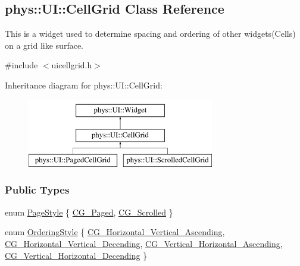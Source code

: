 \hypertarget{classphys_1_1UI_1_1CellGrid}{
\subsection{phys::UI::CellGrid Class Reference}
\label{classphys_1_1UI_1_1CellGrid}
}


This is a widget used to determine spacing and ordering of other widgets(Cells) on a grid like surface.  




{\ttfamily \#include $<$uicellgrid.h$>$}

Inheritance diagram for phys::UI::CellGrid:\begin{figure}[H]
\begin{center}
\leavevmode
\includegraphics[height=3.000000cm]{classphys_1_1UI_1_1CellGrid}
\end{center}
\end{figure}
\subsubsection*{Public Types}
\begin{DoxyCompactItemize}
\item 
enum \hyperlink{classphys_1_1UI_1_1CellGrid_a3644cef16e10c867c233105aae7b4e75}{PageStyle} \{ \hyperlink{classphys_1_1UI_1_1CellGrid_a3644cef16e10c867c233105aae7b4e75a5cc13206330cf9ed55fb443ff4600c77}{CG\_\-Paged}, 
\hyperlink{classphys_1_1UI_1_1CellGrid_a3644cef16e10c867c233105aae7b4e75add8259b571786b4e1976dcdb97a8e9c6}{CG\_\-Scrolled}
 \}
\item 
enum \hyperlink{classphys_1_1UI_1_1CellGrid_a4b77ef63082513fc9f845537d104496b}{OrderingStyle} \{ \hyperlink{classphys_1_1UI_1_1CellGrid_a4b77ef63082513fc9f845537d104496ba40efb4a2512c8f3129eaf967522c9b30}{CG\_\-Horizontal\_\-Vertical\_\-Ascending}, 
\hyperlink{classphys_1_1UI_1_1CellGrid_a4b77ef63082513fc9f845537d104496badecf0f97dbc2c5f4df2ac84b1c063de6}{CG\_\-Horizontal\_\-Vertical\_\-Decending}, 
\hyperlink{classphys_1_1UI_1_1CellGrid_a4b77ef63082513fc9f845537d104496ba6114116f4ee36620ca28d2ca052d6839}{CG\_\-Vertical\_\-Horizontal\_\-Ascending}, 
\hyperlink{classphys_1_1UI_1_1CellGrid_a4b77ef63082513fc9f845537d104496bab220567598ddaadfe133b9fef6f14b43}{CG\_\-Vertical\_\-Horizontal\_\-Decending}
 \}
\end{DoxyCompactItemize}
